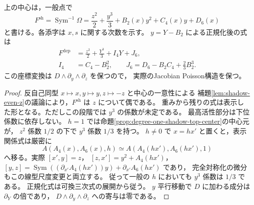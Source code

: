 \begin{lemma}[次数1の中心shadowの正規化]
\label{lem:degree-one-shadow-depression}
上の中心は，一般点で
\[
 F^{\mathrm{sh}}=\operatorname{Sym}^{-1}\Omega
 =\frac{z^2}{2}+\frac{y^3}{3}+B_2(x)y^2+C_4(x)y+D_6(x)
\]
と書ける。各添字は $x,s$ に関する次数を示す。
$y=Y-B_2$ による正規化後の式は
\begin{align*}
 F^{\mathrm{dep}}&=\frac{z^2}{2}+\frac{Y^3}{3}+I_4Y+J_6,\\
 I_4&=C_4-B_2^2,\qquad
 J_6=D_6-B_2C_4+\frac23B_2^3.
\end{align*}
この座標変換は $D\wedge\partial_y\wedge\partial_z$ を保つので，
実際のJacobian Poisson構造を保つ。
\end{lemma}
\begin{proof}
反自己同型 $x\mapsto x,y\mapsto y,z\mapsto-z$ と中心の一意性による
補題\ref{lem:shadow-even-z}の議論により，$F^{\mathrm{sh}}$ は $z$ について偶である。
重みから残りの式は表示した形となる。ただしこの段階では $y^3$ の係数が未定である。
最高活性部分は下位係数に依存しない。
$h=1$ では命題\ref{prop:degree-one-shadow-top-center}の中心元が，
$z^2$ 係数 $1/2$ の下で $y^3$ 係数 $1/3$ を持つ。
$h\ne0$ で $x=h x'$ と置くと，表示関係式は厳密に
\begin{equation}\label{eq:degree-one-shadow-h-scaling}
 A(A_4(x),A_6(x),h)
 \simeq A(A_4(hx'),A_6(hx'),1)
\end{equation}
へ移る。実際 $[x',y]=z$，
$[z,x']=y^2+A_4(hx')$，
$[y,z]=\operatorname{Sym}((\partial_{x'}A_4(hx'))y)+\partial_{x'}A_6(hx')$ であり，
完全対称化の微分もこの線型尺度変更と両立する。
従って一般の $h$ においても $y^3$ 係数は $1/3$ である。
正規化式は可換三次式の展開から従う。
$y$ 平行移動で $D$ に加わる成分は $\partial_Y$ の倍であり，
$D\wedge\partial_y\wedge\partial_z$ への寄与は零である。
\end{proof}

